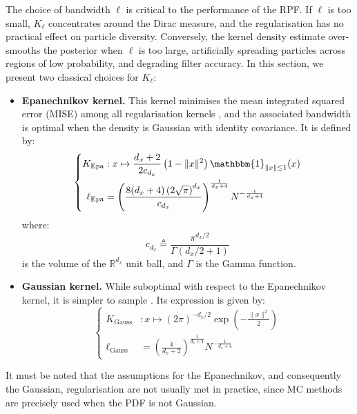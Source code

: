 The choice of bandwidth $\ell$ is critical to the performance of the RPF. If $\ell$ is too small, $K_\ell$ concentrates around the Dirac measure, and the regularisation has no practical effect on particle diversity. Conversely, the kernel density estimate over-smooths the posterior when $\ell$ is too large, artificially spreading particles across regions of low probability, and degrading filter accuracy. In this section, we present two classical choices for $K_\ell$:
\begin{itemize}
	\item\textbf{Epanechnikov kernel.} This kernel minimises the mean integrated squared error (MISE) among all regularisation kernels \cite{bib:Epanechnikov}, and the associated bandwidth is optimal when the density is Gaussian with identity covariance. It is defined by:
	\begin{equation}
		\left\{\begin{aligned}
		K_{\mathrm{Epa}}&:x\mapsto\frac{d_x+2}{2c_{d_x}}\left(1-\|x\|^2\right)\mathbbm{1}_{\|x\|\leq1}(x)\\
		\ell_{\mathrm{Epa}}&=\left(\frac{8(d_x+4)\left(2\sqrt{\pi}\right)^{d_x}}{c_{d_x}}\right)^{\frac{1}{d_x+4}}N^{-\frac{1}{d_x+4}}
		\end{aligned}\right.
	\end{equation}
	where:
	\begin{equation}
		c_{d_x}\triangleq\frac{\pi^{d_x/2}}{\Gamma(d_x/2+1)}
	\end{equation}
	is the volume of the $\mathbb{R}^{d_x}$ unit ball, and $\Gamma$ is the Gamma function.
	\item\textbf{Gaussian kernel.} While suboptimal with respect to the Epanechnikov kernel, it is simpler to sample \cite{bib:random-variate}. Its expression is given by:
	\begin{equation}
		\left\{\begin{aligned}
		K_{\mathrm{Gauss}}&:x\mapsto(2\pi)^{-d_x/2}\exp\left(-\frac{\|x\|^2}{2}\right)\\
		\ell_{\mathrm{Gauss}}&=\left(\frac{4}{d_x+2}\right)^{\frac{1}{d_x+4}}N^{-\frac{1}{d_x+4}}
		\end{aligned}\right.
	\end{equation}
\end{itemize}

It must be noted that the assumptions for the Epanechnikov, and consequently the Gaussian, regularisation are not usually met in practice, since MC methods are precisely used when the PDF is not Gaussian.

